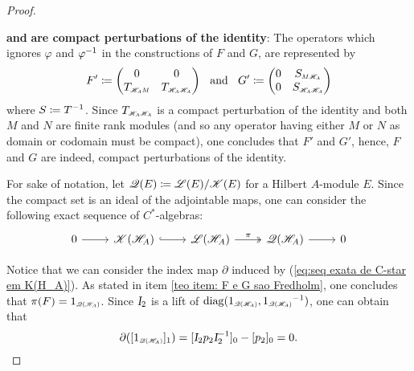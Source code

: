 \begin{teorema}
\begin{proof}
\begin{itroman}
    \item \label{teo item: F e G sao Fredholm} \textbf{and}  \textbf{are compact perturbations of the identity}: The operators which ignores $\varphi$ and ${\varphi}^{-1}$ in the constructions of $F$ and $G$, are represented by
    \begin{equation*}
        F' \coloneqq 
        \begin{pmatrix}
            0 & 0 \\
            \sub{T}{\HA M} & \sub{T}{\HA\HA}
        \end{pmatrix} \e G' \coloneqq \begin{pmatrix}
            0 & \sub{S}{M\HA} \\
            0 & \sub S{\HA\HA}
        \end{pmatrix}
    \end{equation*}
    where $S \coloneqq {T}^{-1}$. Since $\sub{T}{\HA\HA}$ is a compact perturbation of the identity and both $M$ and $N$ are finite rank modules (and so any operator having either $M$ or $N$ as domain or codomain must be compact), one concludes that $F'$ and $G'$, hence, $F$ and $G$ are indeed, compact perturbations of the identity.
\end{itroman}
For sake of notation, let $\mathscr Q(E) \coloneqq {\mathscr L(E)}/{\mathscr K(E)}$ for a Hilbert $A$-module $E$. Since the compact set is an ideal of the adjointable maps, one can consider the following exact sequence of $C^*$-algebras:
\begin{equation}
    \label{eq:seq exata de C-star em K(H_A)}
\begin{tikzcd}
0 \arrow[r] & \mathscr K(\HA) \arrow[r, hook] & \adj(\HA) \arrow[r, "\pi", two heads] & \mathscr Q(\HA) \arrow[r] & 0
\end{tikzcd}
\end{equation}

Notice that we can consider the index map $\partial$ induced by (\ref{eq:seq exata de C-star em K(H_A)}). As stated in item \ref{teo item: F e G sao Fredholm}, one concludes that $\pi(F)= \sub1{\mathscr Q(\HA)}$. Since $\textsl{I}_2$ is a lift of $\diag(\sub1{\mathscr Q(\HA)}, \inv{\sub1{\mathscr Q(\HA)}})$, one can obtain that 
$$\partial([\sub1{\mathscr Q(\HA)}]_1) = [\Id_2 p_2\Id_2^{-1}]_0 - [p_2]_0 = 0.$$


\end{proof}
\end{teorema}
